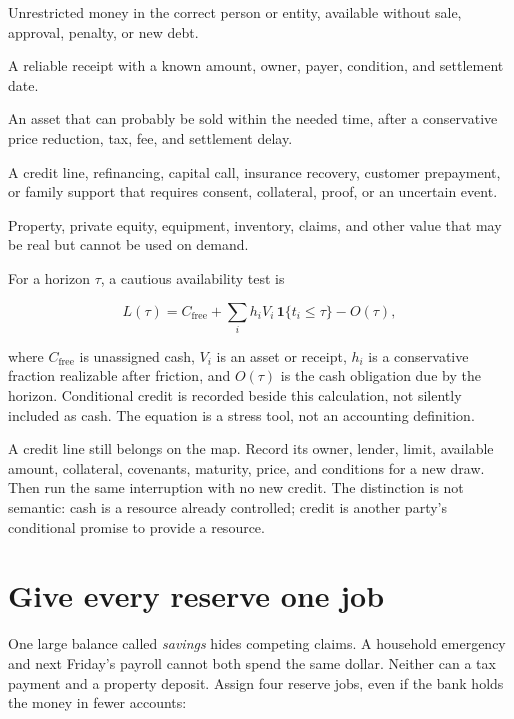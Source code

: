 \begin{description}[leftmargin=2.8em,style=nextline]
\item[Cash now] Unrestricted money in the correct person or entity, available
  without sale, approval, penalty, or new debt.
\item[Cash on date] A reliable receipt with a known amount, owner, payer,
  condition, and settlement date.
\item[Convertible asset] An asset that can probably be sold within the needed
  time, after a conservative price reduction, tax, fee, and settlement delay.
\item[Conditional access] A credit line, refinancing, capital call, insurance
  recovery, customer prepayment, or family support that requires consent,
  collateral, proof, or an uncertain event.
\item[Illiquid value] Property, private equity, equipment, inventory, claims,
  and other value that may be real but cannot be used on demand.
\end{description}

For a horizon \(\tau\), a cautious availability test is

\begin{equation}
L(\tau)=C_{\mathrm{free}}+
        \sum_i h_i V_i\,\mathbf{1}\{t_i\leq\tau\}
        -O(\tau),
\end{equation}

where \(C_{\mathrm{free}}\) is unassigned cash, \(V_i\) is an asset or receipt,
\(h_i\) is a conservative fraction realizable after friction, and \(O(\tau)\)
is the cash obligation due by the horizon. Conditional credit is recorded
beside this calculation, not silently included as cash. The equation is a
stress tool, not an accounting definition.

A credit line still belongs on the map. Record its owner, lender, limit,
available amount, collateral, covenants, maturity, price, and conditions for a
new draw. Then run the same interruption with no new credit. The distinction is
not semantic: cash is a resource already controlled; credit is another party's
conditional promise to provide a resource.

\section{Give every reserve one job}

One large balance called \emph{savings} hides competing claims. A household
emergency and next Friday's payroll cannot both spend the same dollar. Neither
can a tax payment and a property deposit. Assign four reserve jobs, even if the
bank holds the money in fewer accounts:

